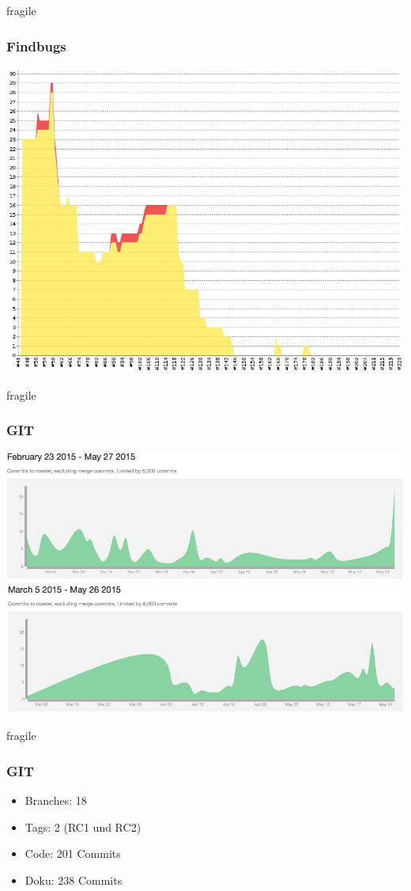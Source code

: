 \documentclass[10pt, compress]{beamer}
\begin{document}
\begin{frame}{fragile}
   \frametitle{Findbugs}
\includegraphics[scale=0.35]{findbugs}
\end{frame}

\begin{frame}{fragile}
   \frametitle{GIT}
   \includegraphics[scale=0.3]{doku}\newline
\includegraphics[scale=0.3]{code}
\end{frame}

\begin{frame}{fragile}
   \frametitle{GIT}
   \begin{itemize}
     \item Branches: 18
     \item Tags: 2 (RC1 und RC2)
     \item Code: 201 Commits
     \item Doku: 238 Commits
   \end{itemize}
\end{frame}
\end{document}
